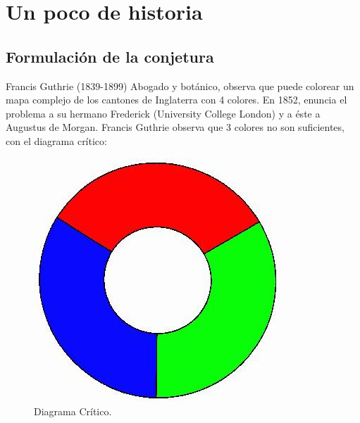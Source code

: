 \documentclass[spanish,utf8]{beamer}
\theoremstyle{definition}
\begin{document}
{
	\begin{frame}[plain]
\end{frame}
}

\section{Un poco de historia}

\subsection{Formulación de la conjetura}

\begin{frame}{\insertsection}\transblindsvertical
\begin{block}{Francis Guthrie (1839-1899)}
Abogado y botánico, observa que puede colorear un mapa complejo de los cantones de Inglaterra con 4 colores. En 1852, enuncia el problema a su hermano Frederick (University College London) y a éste a Augustus de Morgan. Francis Guthrie observa que 3 colores no son suficientes, con el diagrama crítico:
\end{block}

\pause

\begin{figure}[H]
\centering
\includegraphics[scale=0.3]{diagrama.jpg}
\caption{Diagrama Crítico.}
\end{figure}
\end{frame}
\end{document}
